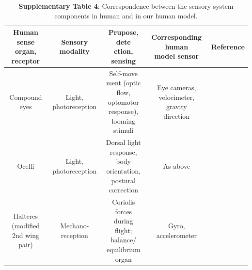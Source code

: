 \documentclass[sn-mathphys-num]{sn-jnl}%
\theoremstyle{thmstyleone}	%
\theoremstyle{thmstyletwo}	%
\theoremstyle{thmstylethree}	%
\begin{document}
\begin{appendices}
\begin{table}[htbp]
	\centering
	\small
	\caption{\textbf{Supplementary Table 4}: 
		Correspondence between the sensory system components in human and in our human model.}
	\begin{tabular}{ccccc}
		\toprule
		\makecell{Human sense\\organ, receptor}         &        Sensory modality  & \makecell{Prupose, dete\\ction, sensing}  & \makecell{Corresponding human\\ model sensor}  & Reference \\
		\midrule
		Compound eyes     &   \makecell{Light,\\ photoreception}      &    \makecell{Self-move\\ment (optic \\flow, \\optomotor \\response), \\looming \\stimuli} & \makecell{Eye cameras, \\ velocimeter, \\ gravity \\ direction} & \cite{hengstenberg1993multisensory,strausfeld1985convergence} \\
		\midrule
		Ocelli     &   \makecell{Light,\\ photoreception}      &    \makecell{Dorsal light\\ response,\\ body\\ orientation,\\ postural \\ correction} & As above & \cite{hengstenberg1993multisensory,strausfeld1985convergence,mimura1970convergence} \\
		\midrule
		\makecell{Halteres \\(modified \\2nd wing pair)}     &   \makecell{Mechano-\\reception}      &   \makecell{Coriolis \\forces during\\ flight; \\balance/\\equilibrium \\organ} & \makecell{Gyro, \\accelerometer} & \cite{strausfeld1985convergence,fayyazuddin1996haltere} \\

\end{tabular}
\end{table}
\end{appendices}
\end{document}
